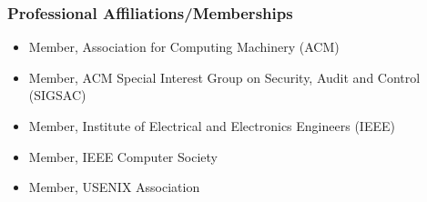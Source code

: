 \hypertarget{professional-affiliations-memberships}{%
\subsubsection{Professional Affiliations/Memberships}\label{professional-affiliations-memberships}}

\begin{itemize}
\tightlist
\item Member, Association for Computing Machinery (ACM)
\item Member, ACM Special Interest Group on Security, Audit and Control (SIGSAC)
\item Member, Institute of Electrical and Electronics Engineers (IEEE)
\item Member, IEEE Computer Society
\item Member, USENIX Association
\end{itemize}

